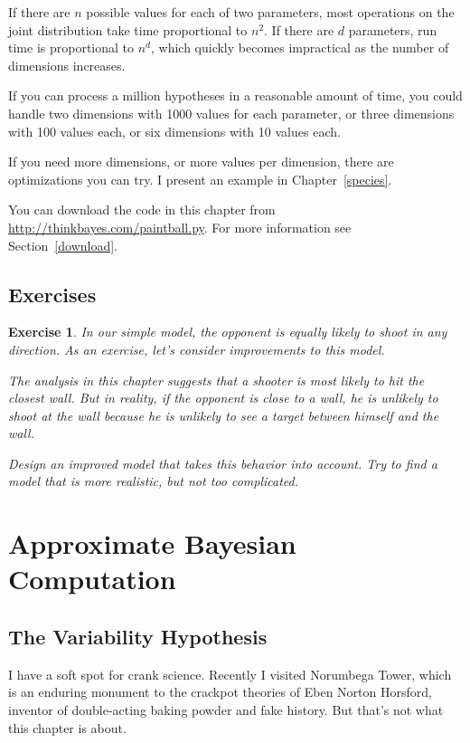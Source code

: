 \documentclass[12pt]{book}
\theoremstyle{exercise}
\newtheorem{exercise}{Exercise}[chapter]
\begin{document}
If there are $n$ possible values for each of two parameters, most
operations on the joint distribution take time proportional to $n^2$.
If there are $d$ parameters, run time is proportional to $n^d$,
which quickly becomes impractical as the number of dimensions increases.

If you can process a million hypotheses in a reasonable amount of time,
you could handle two dimensions with 1000 values for each parameter,
or three dimensions with 100 values each, or six dimensions with 10
values each.

If you need more dimensions, or more values per dimension, there are
optimizations you can try.  I present an example
in Chapter~\ref{species}.

You can download the code in this chapter from
\url{http://thinkbayes.com/paintball.py}.
  For more information
see Section~\ref{download}.

\section{Exercises}

\begin{exercise}
In our simple model, the opponent is equally likely to shoot in any
direction.  As an exercise, let's consider improvements to this model.

The analysis in this chapter suggests that a shooter is most likely to
hit the closest wall.  But in reality, if the opponent is close to a
wall, he is unlikely to shoot at the wall because he is unlikely to
see a target between himself and the wall.

Design an improved model that takes this behavior
into account.  Try to find a model that is more realistic, but not
too complicated.
\end{exercise}





\chapter{Approximate Bayesian Computation}

\section{The Variability Hypothesis}

I have a soft spot for crank science.  Recently I visited Norumbega
Tower, which is an enduring monument to the crackpot theories of Eben
Norton Horsford, inventor of double-acting baking powder and fake
history.  But that's not what this chapter is about.
\end{document}
